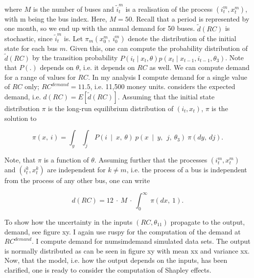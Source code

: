 where $M$ is the number of buses and ${\tilde{i}}_t^m$ is a realisation of the process $(i_t^m, x_t^m)$, with m being the bus index. Here, $M=50$. Recall that a period is represented by one month, so we end up with the annual demand for 50 buses. $\tilde{d}(RC)$ is stochastic, since ${\tilde{i}}_t^m$ is. Let $\pi_m(x_0^m,\ i_0^m)$ denote the distribution of the initial state for each bus $m$. Given this, one can compute the probability distribution of $\tilde{d}(RC) $ by the transition probability $P(i_t \mid x_t, \theta)p(x_t \mid x_{t-1}, i_{t-1}, \theta_3) $. Note that $P(.)$ depends on $\theta$, i.e. it depends on $RC$ as well. We can compute demand for a range of values for $RC$. In my analysis I compute demand for a single value of $RC$ only; $RC^{demand}=11.5$, i.e. 11,500 money units. \cite{R87} considers the expected demand, i.e. $d(RC)=E[\tilde{d}(RC)]$. Assuming that the initial state distribution $\pi$ is the long-run equilibrium distribution of $(i_t, x_t)$, $\pi$ is the solution to

\begin{equation}
\pi(x,\ i)=\int_y\ \int_j\ P(i\ \mid\ x,\ \theta)\ p(x\ \mid\ y,\ \ j,\ \theta_3)\ \pi(dy,\ dj).
\end{equation}

Note, that $\pi$ is a function of $\theta$. Assuming further that the processes $ (i_t^m, x_t^m)$ and $(i_t^k, x_t^k)$ are independent for $k \neq m$, i.e. the process of a bus is independent from the process of any other bus, one can write

\begin{equation}
d(RC)=12\ \cdot\ M\ \cdot\ \int_0^{\infty}\ \pi(dx,\ 1).
\end{equation}

To show how the uncertainty in the inputs $(RC, \theta_{11})$ propagate to the output, demand, see figure xy. I again use ruspy for the computation of the demand at $RC^{demand}$. I compute demand for numsimdemand simulated data sets. The output is normally distributed as can be seen in figure xy with mean xx and variance xx.
Now, that the model, i.e. how the output depends on the inputs, has been clarified, one is ready to consider the computation of Shapley effects.
